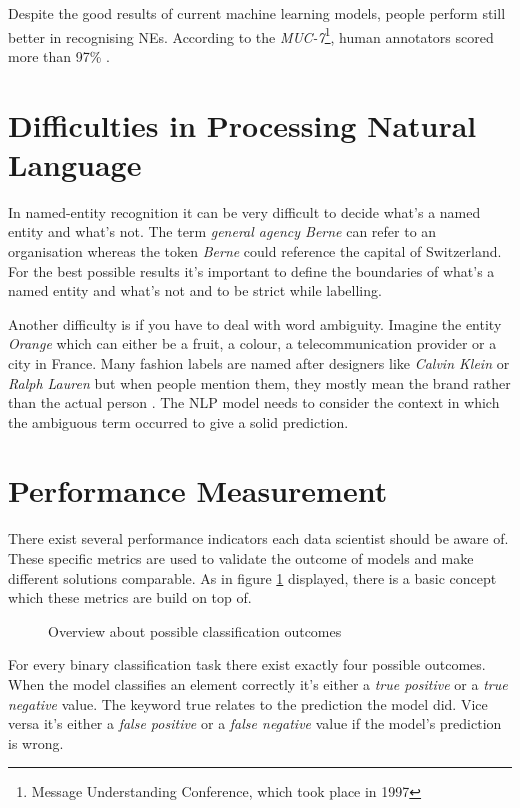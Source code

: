 Despite the good results of current machine learning models, people perform still better in recognising NEs. According to the \emph{MUC-7}\footnote{Message Understanding Conference, which took place in 1997}, human annotators scored more than 97\% \cite{wiki04}.

\section{Difficulties in Processing Natural Language}

In named-entity recognition it can be very difficult to decide what's a named entity and what's not. The term \emph{general agency Berne} can refer to an organisation whereas the token \emph{Berne} could reference the capital of Switzerland. For the best possible results it's important to define the boundaries of what's a named entity and what's not and to be strict while labelling.

Another difficulty is if you have to deal with word ambiguity. Imagine the entity \emph{Orange} which can either be a fruit, a colour, a telecommunication provider or a city in France. Many fashion labels are named after designers like \emph{Calvin Klein} or \emph{Ralph Lauren} but when people mention them, they mostly mean the brand rather than the actual person \cite{Vogel19}. The NLP model needs to consider the context in which the ambiguous term occurred to give a solid prediction.

\section{Performance Measurement}
\label{chap:formulas}

There exist several performance indicators each data scientist should be aware of. These specific metrics are used to validate the outcome of models and make different solutions comparable. As in figure \ref{fig:metrics} displayed, there is a basic concept which these metrics are build on top of.

\begin{figure}[!ht]
\centering
{}
\caption{Overview about possible classification outcomes\cite{wiki01}}
\label{fig:metrics}
\end{figure}

For every binary classification task there exist exactly four possible outcomes. When the model classifies an element correctly it's either a \emph{true positive} or a \emph{true negative} value. The keyword true relates to the prediction the model did. Vice versa it's either a \emph{false positive} or a \emph{false negative} value if the model's prediction is wrong.

